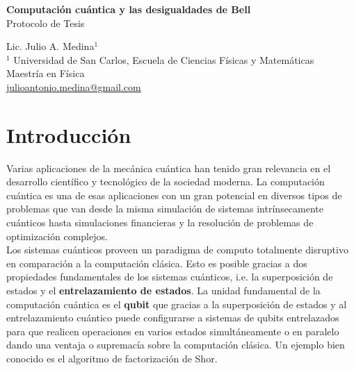 \documentclass[a4paper]{article}
\begin{document}

\Large
 \begin{center}
\textbf{Computación cuántica y las desigualdades de Bell}\\
Protocolo de Tesis

\hspace{10pt}

\large
Lic. Julio A. Medina$^1$ \\

\hspace{10pt}
\small  
$^1$ Universidad de San Carlos, Escuela de Ciencias Físicas y Matemáticas\\
Maestría en Física\\
\href{mailto:julioantonio.medina@gmail.com}{julioantonio.medina@gmail.com}\\

\end{center}

\hspace{10pt}


\normalsize



\section{Introducción}
Varias aplicaciones de la mecánica cuántica han tenido gran relevancia en el desarrollo científico y tecnológico de la sociedad moderna. La computación cuántica es una de esas aplicaciones con un gran potencial en diversos tipos de problemas que van desde la misma simulación de sistemas intrínsecamente cuánticos hasta simulaciones financieras y la resolución de problemas de optimización complejos. \\

Los sistemas cuánticos proveen un paradigma de computo totalmente disruptivo en comparación a la computación clásica. Esto es posible gracias a dos propiedades fundamentales de los sistemas cuánticos, i.e. la superposición de estados y el \textbf{entrelazamiento de estados}. La unidad fundamental de la computación cuántica es el \textbf{qubit} que gracias a la superposición de estados y al entrelazamiento cuántico puede configurarse a sistemas de qubits entrelazados para que realicen operaciones en varios estados simultáneamente o en paralelo dando una ventaja o supremacía sobre la computación clásica. Un ejemplo bien conocido es el algoritmo de factorización de Shor.
\end{document}
